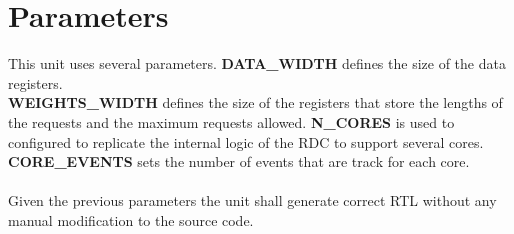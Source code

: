 \section{Parameters}
\label{chapter3}
This unit uses several parameters. \textbf{DATA\_WIDTH} defines the size of the data registers.\\
\textbf{WEIGHTS\_WIDTH} defines the size of the registers that store the lengths of the requests and the maximum requests allowed.\textbf{ N\_CORES} is used to configured to replicate the internal logic of the RDC to support several cores. \textbf{CORE\_EVENTS} sets the number of events that are track for each core.\\
\\
Given the previous parameters the unit shall generate correct RTL without any manual modification to the source code.\\
\\